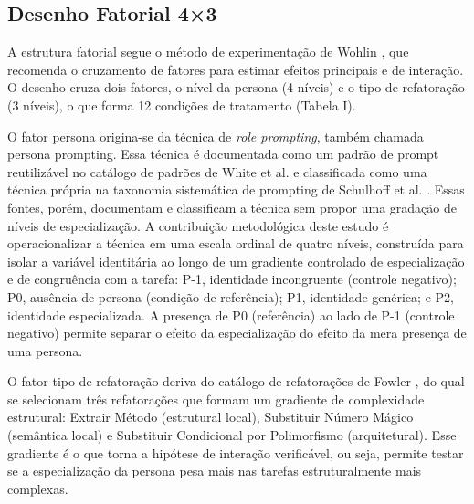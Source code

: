 \documentclass[10pt,conference,a4paper,twocolumn]{article}
\begin{document}
\subsection{Desenho Fatorial 4×3}
A estrutura fatorial segue o método de experimentação de Wohlin \cite{wohlin}, que recomenda o cruzamento de fatores para estimar efeitos principais e de interação. O desenho cruza dois fatores, o nível da persona (4 níveis) e o tipo de refatoração (3 níveis), o que forma 12 condições de tratamento (Tabela I).

O fator persona origina-se da técnica de \textit{role prompting}, também chamada persona prompting. Essa técnica é documentada como um padrão de prompt reutilizável no catálogo de padrões de White et al. \cite{white2023} e classificada como uma técnica própria na taxonomia sistemática de prompting de Schulhoff et al. \cite{schulhoff2024}. Essas fontes, porém, documentam e classificam a técnica sem propor uma gradação de níveis de especialização. A contribuição metodológica deste estudo é operacionalizar a técnica em uma escala ordinal de quatro níveis, construída para isolar a variável identitária ao longo de um gradiente controlado de especialização e de congruência com a tarefa: P-1, identidade incongruente (controle negativo); P0, ausência de persona (condição de referência); P1, identidade genérica; e P2, identidade especializada. A presença de P0 (referência) ao lado de P-1 (controle negativo) permite separar o efeito da especialização do efeito da mera presença de uma persona.

O fator tipo de refatoração deriva do catálogo de refatorações de Fowler \cite{fowler}, do qual se selecionam três refatorações que formam um gradiente de complexidade estrutural: Extrair Método (estrutural local), Substituir Número Mágico (semântica local) e Substituir Condicional por Polimorfismo (arquitetural). Esse gradiente é o que torna a hipótese de interação verificável, ou seja, permite testar se a especialização da persona pesa mais nas tarefas estruturalmente mais complexas.
\end{document}
